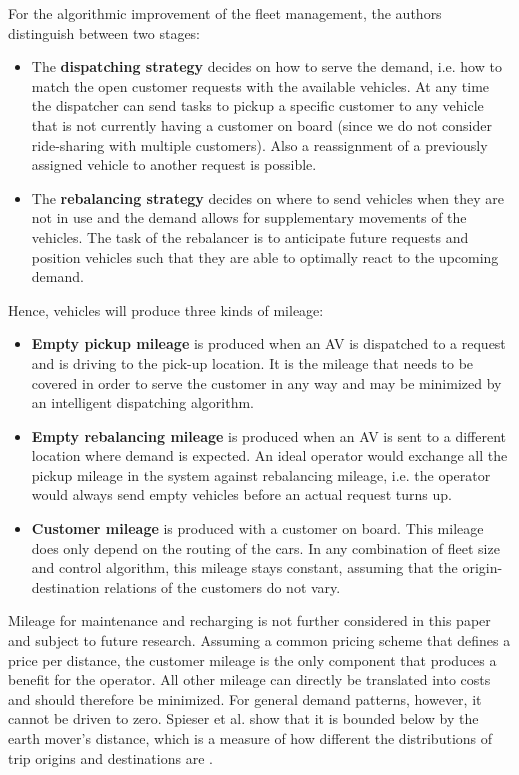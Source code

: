 For the algorithmic improvement of the fleet management, the authors distinguish
between two stages:

\begin{itemize}
\item The \textbf{dispatching strategy} decides on how to serve the demand, i.e.
how to match the open customer requests with the available vehicles. At any time the dispatcher can send tasks to pickup a specific customer to any vehicle that is not currently having a customer on board (since we do not consider ride-sharing with multiple customers). Also a reassignment of a previously assigned
vehicle to another request is possible.
\item The \textbf{rebalancing strategy} decides on where to send vehicles when they
are not in use and the demand allows for supplementary movements of the vehicles.
The task of the rebalancer is to anticipate future requests and position vehicles
such that they are able to optimally react to the upcoming demand.
\end{itemize}

Hence, vehicles will produce three kinds of mileage:

\begin{itemize}
\item \textbf{Empty pickup mileage} is produced when an AV is dispatched
to a request and is driving to the pick-up location. It is the mileage that needs
to be covered in order to serve the customer in any way and may be minimized
by an intelligent dispatching algorithm.
\item \textbf{Empty rebalancing mileage} is produced when an AV is sent
to a different location where demand is expected. An ideal operator would
exchange all the pickup mileage in the system against rebalancing mileage, i.e. the operator would always send empty vehicles before an actual request turns up.
\item \textbf{Customer mileage} is produced with a customer on board. This mileage does only depend on the routing of the cars. In any combination of fleet size and
control algorithm, this mileage stays constant, assuming that the origin-destination relations of the customers do not vary.
\end{itemize}

Mileage for maintenance and recharging is not further considered in this paper and subject to future research.
Assuming a common pricing scheme that defines a price per distance, the customer mileage
is the only component that produces a benefit for the operator. All other mileage
can directly be translated into costs and should therefore be minimized. For general
demand patterns, however, it cannot be driven to zero. Spieser et al. \cite{spieser2014toward}
show that it is bounded below by the earth mover's distance, which is a measure
of how different the distributions of trip origins and destinations are \cite{ruschendorf1985wasserstein}.

